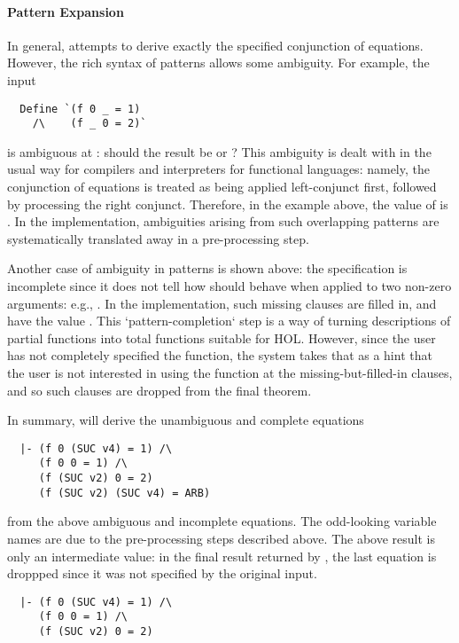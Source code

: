 \paragraph{Pattern Expansion}
In general,  attempts to derive exactly the specified
conjunction of equations. However, the rich syntax of patterns allows
some ambiguity. For example, the input
%
\begin{hol}
\begin{verbatim} 
  Define `(f 0 _ = 1)
    /\    (f _ 0 = 2)`
\end{verbatim} 
\end{hol}
%
is ambiguous at : should the result be  or
?  This ambiguity is dealt with in the usual way for compilers and
interpreters for functional languages: namely, the conjunction of
equations is treated as being applied left-conjunct first, followed
by processing the right conjunct. Therefore, in the example above, the
value of  is . In the implementation, 
ambiguities arising from such overlapping patterns are systematically 
translated away in a pre-processing step.
 
 Another case of ambiguity in patterns is shown above: the specification
is incomplete since it does not tell how  should behave when
applied to two non-zero arguments: e.g., . In the
implementation, such missing clauses are filled in, and have the value
. This `pattern-completion` step is a way of turning descriptions
of partial functions into total functions suitable for HOL. However,
since the user has not completely specified the function, the system
takes that as a hint that the user is not interested in using the
function at the missing-but-filled-in clauses, and so such clauses are
dropped from the final theorem.
 
In summary,  will derive the unambiguous and complete
equations
%
\begin{hol}
\begin{verbatim} 
  |- (f 0 (SUC v4) = 1) /\
     (f 0 0 = 1) /\
     (f (SUC v2) 0 = 2)
     (f (SUC v2) (SUC v4) = ARB)
\end{verbatim} 
\end{hol}
%
from the above ambiguous and incomplete equations. The odd-looking
variable names are due to the pre-processing steps described above. The
above result is only an intermediate value: in the final result returned
by \ml{Define}, the last equation is droppped since it was not 
specified by the original input.
\begin{hol}
\begin{verbatim} 
  |- (f 0 (SUC v4) = 1) /\
     (f 0 0 = 1) /\
     (f (SUC v2) 0 = 2)
\end{verbatim} 
\end{hol}
  
